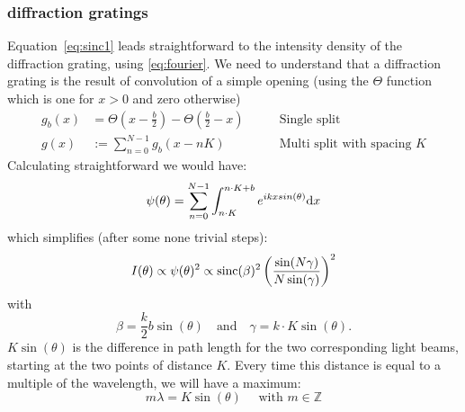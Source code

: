 \subsubsection{diffraction gratings}
Equation~\eqref{eq:sinc1} leads straightforward to the intensity density of
the diffraction grating, using \eqref{eq:fourier}. We need to understand 
that a diffraction grating is the result of convolution of a simple opening
(using the $\Theta$ function which is one for $x>0$ and zero otherwise)
\begin{align}
    \label{eq:multisplit}
    g_b(x) &= \Theta(x - \frac{b}{2}) - \Theta( \frac{b}{2} - x ) \qquad
           &\text{Single split} \\ 
   g(x)   &:= \sum_{n=0}^{N-1} g_b(x-nK) 
         \qquad &\text{Multi split with spacing } K
\end{align}
Calculating straightforward we would have:
\begin{equation}
    \psi(\theta) = \sum_{n = 0}^{N-1}  \int^{n \cdot K + b}_{n \cdot K} e^{i k x sin(\theta)} \mathrm{d} x
\end{equation}
which simplifies (after some none trivial steps):
\begin{equation}
    I(\theta) \propto \psi(\theta)^2 \propto \mathrm{sinc}(\beta)^2 \left (\frac{\sin(N\gamma)}{N \sin(\gamma)}\right )^2
\end{equation}
with
\begin{equation}
    \beta = \frac{k}{2}b \sin(\theta) \quad \text{and} \quad \gamma = k\cdot K \sin(\theta).
\end{equation}
$K \sin (\theta)$ is the difference in path length for the two corresponding light beams, 
starting at the two points of distance $K$. Every time
this distance is equal to a multiple of the wavelength, we will have a maximum:
\begin{equation}
    m \lambda = K \sin(\theta) \quad \text{ with }m \in \mathbb{Z}
    \label{eq:N_lines_interference}
\end{equation}

